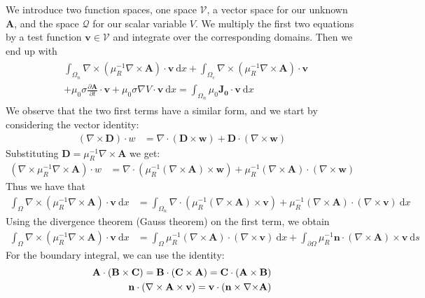 \documentclass{article}
\newcommand{\curlp}[1]{\nabla \times \left(#1\right)}
\newcommand{\curl}[1]{\nabla \times #1}
\newcommand{\divmp}[1]{\nabla \cdot \left(#1\right)}
\newcommand{\mbf}[1]{\mathbf{#1}}
\newcommand{\ddn}[2]{\frac{\partial #1}{\partial #2}}
\newcommand{\dx}[0]{~\mathrm{d}x}
\newcommand{\ds}[0]{~\mathrm{d}s}
\newcommand{\pOmega}[0]{\partial\Omega}
\begin{document}
We introduce two function spaces, one space $\mathcal{V}$, a vector
space for our unknown $\mbf{A}$, and the space $\mathcal{Q}$ for our
scalar variable $V$. We multiply the first two equations by a test
function $\mbf{v} \in \mathcal{V}$ and integrate over the corresponding
domains. Then we end up with
\begin{align}
    \begin{split}
    &\int_{\Omega_n} \curlp{\mu_R^{-1} \nabla \times \mbf{A}} \cdot \mbf{v}\dx  + \int_{\Omega_c} \curlp{\mu_R^{-1} \nabla \times \mbf{A}}\cdot \mbf{v}\\
    &+ \mu_0\sigma \ddn{\mbf{A}}{t}\cdot \mbf{v} + \mu_0\sigma \nabla V \cdot \mbf{v}\dx
    =\int_{\Omega_n}\mu_0\mbf{J_0} \cdot \mbf{v} \dx
    \end{split}
\end{align}
We observe that the two first terms have a similar form, and we start by
considering the vector identity:
\begin{align*}
    (\curl{\mbf{D}})\cdot w&=  \divmp{\mbf{D} \times \mbf{w}} + \mbf{D}\cdot (\curl \mbf{w})
\end{align*}
Substituting $\mbf{D}=\mu_R^{-1}\curl \mbf{A}$ we get:
\begin{align*}
    (\curl{\mu_R^{-1}\curl\mbf{A}})\cdot w&=  \divmp{\mu_R^{-1}(\curl\mbf{A}) \times \mbf{w}} + \mu_R^{-1}(\curl\mbf{A})\cdot (\curl \mbf{w})
\end{align*}
Thus we have that
\begin{align}
    \int_{\Omega} \curlp{\mu_R^{-1} \nabla \times \mbf{A}} \cdot \mbf{v}\dx&=
    \int_{\Omega_n}\divmp{\mu_R^{-1}(\curl\mbf{A}) \times \mbf{v}} + \mu_R^{-1}(\curl\mbf{A})\cdot (\curl \mbf{v}) \dx
\end{align}
Using the divergence theorem (Gauss theorem) on the first term, we
obtain
\begin{align}
    \int_{\Omega} \curlp{\mu_R^{-1} \nabla \times \mbf{A}} \cdot \mbf{v}\dx&=
    \int_{\Omega}\mu_R^{-1}(\curl\mbf{A})\cdot (\curl \mbf{v}) \dx
    + \int_{\pOmega}\mu_R^{-1}\mbf{n}\cdot(\curl\mbf{A}) \times \mbf{v}\ds
\end{align}
For the boundary integral, we can use the identity:
\begin{align}
\begin{split}
    \mbf A\cdot (\mbf B\times \mbf C) = \mbf B\cdot(\mbf C \times \mbf A) = \mbf C \cdot (\mbf A \times \mbf B)\\
    \mbf n \cdot (\curl \mbf A \times \mbf v) = \mbf v \cdot (\mbf n \times \mbf \curl \mbf A)
\end{split}
\end{align}
\end{document}
